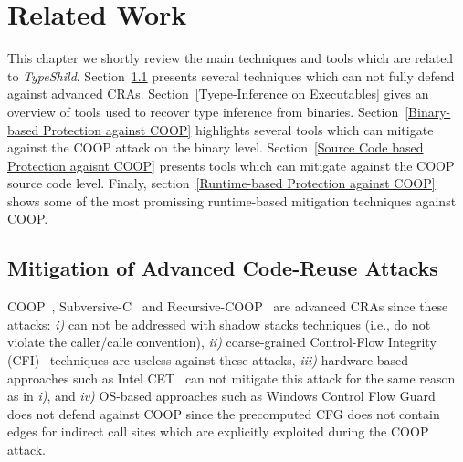 \chapter{Related Work}
\label{chapter:Related_Work}
This chapter we shortly review the main techniques and tools which are related 
to \textit{TypeShild}. 
Section~\ref{Mitigation of Advanced Code-Reuse Attacks} presents 
several techniques which can not fully defend against advanced CRAs.
Section~\ref{Tyepe-Inference on Executables} gives an overview of tools used to
recover type inference from binaries.
Section~\ref{Binary-based Protection against COOP} highlights several tools which can
mitigate against the COOP attack on the binary level.
Section~\ref{Source Code based Protection agaisnt COOP} presents tools which can
mitigate against the COOP source code level.
Finaly, section~\ref{Runtime-based Protection against COOP} shows some of the most promissing 
runtime-based mitigation techniques against COOP.

\section{Mitigation of Advanced Code-Reuse Attacks}
\label{Mitigation of Advanced Code-Reuse Attacks}

COOP~\cite{schuster:coop}, Subversive-C~\cite{subversive-c:lettner} and Recursive-COOP~\cite{trap:crane} 
are advanced CRAs since these attacks:
\textit{i)} can not be addressed with shadow stacks techniques (i.e., do not violate the caller/calle convention), 
\textit{ii)} coarse-grained Control-Flow Integrity (CFI)~\cite{abadi:cfi2, abadi:cfi} techniques are useless against these attacks, 
\textit{iii)} hardware based approaches such as Intel CET~\cite{intel:cet} can not mitigate this attack for the same reason as in \textit{i)}, and 
\textit{iv)} OS-based approaches such as Windows Control Flow Guard~\cite{windows:cfguard} 
does not defend against COOP since the precomputed CFG does not contain edges for indirect call sites which are explicitly exploited
during the COOP attack.

